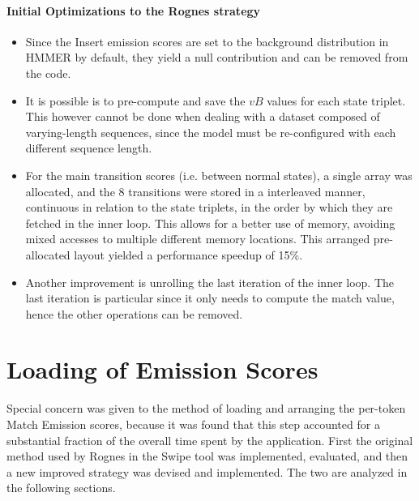 \paragraph*{Initial Optimizations to the Rognes strategy}

\begin{itemize}


\item Since the Insert emission scores are set to the background distribution in HMMER by default, they yield a null contribution and can be removed from the code.

\item It is possible is to pre-compute and save the $vB$ values for each state triplet. This however cannot be done when dealing with a dataset composed of varying-length sequences, since the model must be re-configured with each different sequence length.

\item For the main transition scores (i.e. between normal states), a single array was allocated, and the 8 transitions were stored in a interleaved manner, continuous in relation to the state triplets, in the order by which they are fetched in the inner loop. This allows for a better use of memory, avoiding mixed accesses to multiple different memory locations.
This arranged pre-allocated layout yielded a performance speedup of 15\%. 

\item Another improvement is unrolling the last iteration of the inner loop. The last iteration is particular since it only needs to compute the match value, hence the other operations can be removed.

\end{itemize}




\section {Loading of Emission Scores}
\label {Loading of Emission Scores}

Special concern was given to the method of loading and arranging the per-token Match Emission scores, because it was found that this step accounted for a substantial fraction of the overall time spent by the application. First the original method used by Rognes in the Swipe tool was implemented, evaluated, and then a new improved strategy was devised and implemented. The two are analyzed in the following sections.


